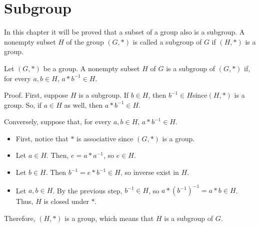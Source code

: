 \section{Subgroup}
\label{sec:subgroup}
In this chapter it will be proved that a subset of a group also is a subgroup.
A nonempty subset $H$ of the group $(G,*)$ is called a subgroup of $G$ if $(H,*)$ is a group.

Let $(G,*)$ be a group. A nonempty subset $H$ of $G$ is a subgroup of $(G,*)$ if, for every $a, b \in H$, $a * b^{-1} \in H$.

Proof. First, suppose $H$ is a subgroup. If $b \in H$, then $b^{-1} \in H $since$ (H,*)$ is a group. So, if $a \in H$ as well, then $a * b^{-1} \in H$.

Conversely, suppose that, for every $a, b \in H$, $a * b^{-1} \in H$.

\begin {itemize}
\item First, notice that $*$ is associative since $(G,*)$ is a group.
\item Let $a \in H$. Then, $e = a * a^{-1}$, so $e \in H$.
\item Let $b \in H$. Then $b^{-1} = e * b^{-1} \in H$, so inverse exist in $H$.
\item Let $a, b \in H$. By the previous step, $b^{-1} \in H$, so $a* (b^{-1})^{-1} = a* b \in H$. Thus, $H$ is closed under $*$.
\end {itemize}

Therefore, $(H,*)$ is a group, which means that $H$ is a subgroup of $G$.
